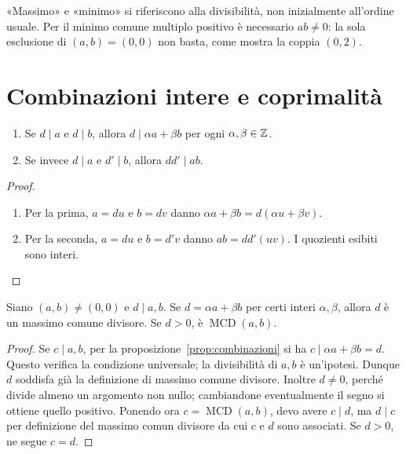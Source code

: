 \begin{osservazione}
«Massimo» e «minimo» si riferiscono alla divisibilità, non inizialmente all'ordine usuale. Per il minimo comune multiplo positivo è necessario $ab\ne0$: la sola esclusione di $(a,b)=(0,0)$ non basta, come mostra la coppia $(0,2)$.
\end{osservazione}

\section{Combinazioni intere e coprimalità}
\begin{proposizione}\label{prop:combinazioni}
\begin{enumerate}[label=\arabic*.]
\item Se $d\mid a$ e $d\mid b$, allora $d\mid\alpha a+\beta b$ per ogni $\alpha,\beta\in\mathbb{Z}$.
\item Se invece $d\mid a$ e $d'\mid b$, allora $dd'\mid ab$.
\end{enumerate}
\end{proposizione}
\begin{proof}
\begin{enumerate}[label=\arabic*.]
\item Per la prima, $a=du$ e $b=dv$ danno $\alpha a+\beta b=d(\alpha u+\beta v)$.
\item Per la seconda, $a=du$ e $b=d'v$ danno $ab=dd'(uv)$. I quozienti esibiti sono interi.
\end{enumerate}
\end{proof}

\begin{proposizione}\label{prop:criterio-mcd}
Siano $(a,b)\ne(0,0)$ e $d\mid a,b$. Se $d=\alpha a+\beta b$ per certi interi $\alpha,\beta$, allora $d$ è un massimo comune divisore. Se $d>0$, è $\operatorname{MCD}(a,b)$.
\end{proposizione}
\begin{proof}
Se $c\mid a,b$, per la proposizione~\ref{prop:combinazioni} si ha $c\mid\alpha a+\beta b=d$. Questo verifica la condizione universale; la divisibilità di $a,b$ è un'ipotesi. Dunque $d$ soddisfa già la definizione di massimo comune divisore. Inoltre $d\ne0$, perché divide almeno un argomento non nullo; cambiandone eventualmente il segno si ottiene quello positivo. Ponendo ora $c=\operatorname{MCD}(a,b)$, devo avere $c\mid d$, ma $d\mid c$ per definizione del massimo comun divisore da cui $c$ e $d$ sono associati. Se $d>0$, ne segue $c=d$.
\end{proof}

